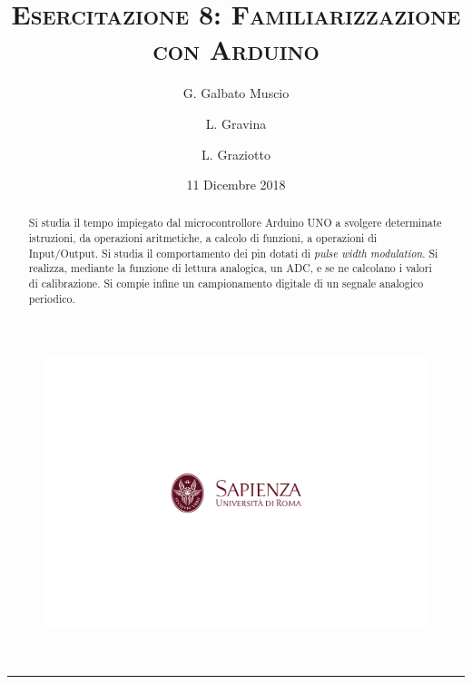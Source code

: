 \documentclass[10pt,oneside,a4paper]{article}
\title{\textsc{\textbf{Esercitazione 8}: Familiarizzazione con Arduino}}
\author{\small{G. Galbato Muscio} \and \small{L. Gravina} \and \small{L. Graziotto}}
\date{11 Dicembre 2018}
\begin{document}
	\begin{figure}
		\centering
		\includegraphics[scale=0.5, trim={2.8cm 8.9cm 0 9cm}, clip]{logo.png}
	\end{figure}
	\maketitle
	\begin{center} 
		 \\
	\end{center}
\hrule
\vspace{0.5cm}
\renewcommand{\abstractname}{Abstract}
\begin{abstract}
Si studia il tempo impiegato dal microcontrollore Arduino UNO a svolgere determinate istruzioni, da operazioni aritmetiche, a calcolo di funzioni, a operazioni di Input/Output. Si studia il comportamento dei pin dotati di \emph{pulse width modulation}. Si realizza, mediante la funzione di lettura analogica, un ADC, e se ne calcolano i valori di calibrazione. Si compie infine un campionamento digitale di un segnale analogico periodico.
\end{abstract}
\vspace{4cm}
\tableofcontents %
\newpage


\pagebreak
\end{document}
